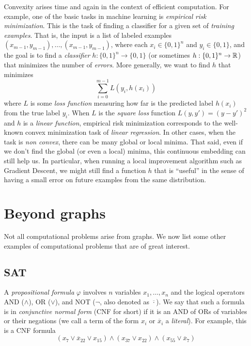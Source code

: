Convexity arises time and again in the context of efficient computation.
For example, one of the basic tasks in machine learning is
\emph{empirical risk minimization}. This is the task of finding a
classifier for a given set of \emph{training examples}. That is, the
input is a list of labeled examples
\((x_{m-1},y_{m-1}),\ldots,(x_{m-1},y_{m-1})\), where each
\(x_i \in \{0,1\}^n\) and \(y_i \in \{0,1\}\), and the goal is to find a
\emph{classifier} \(h:\{0,1\}^n \rightarrow \{0,1\}\) (or sometimes
\(h:\{0,1\}^n \rightarrow {\mathbb{R}}\)) that minimizes the number of
\emph{errors}. More generally, we want to find \(h\) that minimizes \[
\sum_{i=0}^{m-1}L(y_i,h(x_i))
\] where \(L\) is some \emph{loss function} measuring how far is the
predicted label \(h(x_i)\) from the true label \(y_i\). When \(L\) is
the \emph{square loss} function \(L(y,y')=(y-y')^2\) and \(h\) is a
\emph{linear function}, empirical risk minimization corresponds to the
well-known convex minimization task of \emph{linear regression}. In
other cases, when the task is \emph{non convex}, there can be many
global or local minima. That said, even if we don't find the global (or
even a local) minima, this continuous embedding can still help us. In
particular, when running a local improvement algorithm such as Gradient
Descent, we might still find a function \(h\) that is ``useful'' in the
sense of having a small error on future examples from the same
distribution.

\section{Beyond graphs}\label{Beyond-graphs}

Not all computational problems arise from graphs. We now list some other
examples of computational problems that are of great interest.

\subsection{SAT}\label{SAT}

A \emph{propositional formula} \(\varphi\) involves \(n\) variables
\(x_1,\ldots,x_n\) and the logical operators AND (\(\wedge\)), OR
(\(\vee\)), and NOT (\(\neg\), also denoted as \(\overline{\cdot}\)). We
say that such a formula is in \emph{conjunctive normal form} (CNF for
short) if it is an AND of ORs of variables or their negations (we call a
term of the form \(x_i\) or \(\overline{x}_i\) a \emph{literal}). For
example, this is a CNF formula \[
(x_7 \vee \overline{x}_{22} \vee x_{15} ) \wedge (x_{37} \vee x_{22}) \wedge (x_{55} \vee \overline{x}_7)
\]

